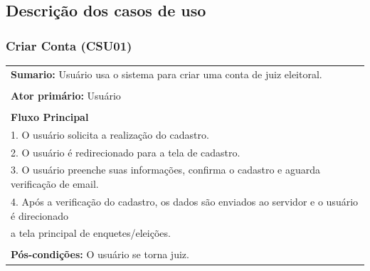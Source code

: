 \documentclass[a4paper,12pt]{article}
\begin{document}
\subsection*{Descrição dos casos de uso}
\markright{}

\begin{center}
{\subsubsection*{Criar Conta (CSU01)}}
\end{center}
\markright{}
\begin{tabular}{|l|}\hline
	{\textbf{Sumario:}} Usuário usa o sistema para criar uma conta de juiz eleitoral. \\\\
	{\textbf{Ator primário:}} Usuário \\\\
	{\textbf{Fluxo Principal}}\\
	1. O usuário solicita a realização do cadastro.\\
	2. O usuário é redirecionado para a tela de cadastro. \\
	3. O usuário preenche suas informações, confirma o cadastro e aguarda verificação de email.\\
	4. Após a verificação do cadastro, os dados são enviados ao servidor e o usuário é direcionado\\ a tela principal de enquetes/eleições.\\\\
	{\textbf{Pós-condições:}} O usuário se torna juiz.\\
	\hline
\end{tabular}
\end{document}
